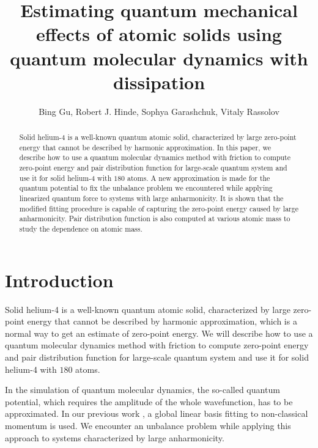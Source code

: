 \documentclass[11pt,letter,nocenter]{revtex4-1}
\begin{document}
\title{Estimating quantum mechanical effects of atomic solids using quantum molecular dynamics with dissipation}
\author{Bing Gu, Robert J. Hinde, Sophya Garashchuk, Vitaly Rassolov}

\begin{abstract}
 Solid helium-4 is a well-known quantum atomic solid, characterized by large zero-point energy that cannot be described by harmonic approximation. In this paper, we describe  how to use a quantum molecular dynamics method with friction to compute zero-point energy and pair distribution function for large-scale quantum system and use it for solid helium-4 with $180$ atoms.  A new approximation is made for the quantum potential to fix the unbalance problem we encountered while applying linearized quantum force \cite{Garashchuk2004} to systems with large anharmonicity.  It  is shown that the modified fitting procedure is capable of capturing the zero-point energy caused by large anharmonicity. Pair distribution function is also computed at various atomic mass to study the dependence on atomic mass. 

\end{abstract}

\maketitle

\section{Introduction}

 Solid helium-4 is a well-known quantum atomic solid, characterized by large zero-point energy that cannot be described by harmonic approximation, which is a normal way to get an estimate of zero-point energy.  
We will describe how to use a quantum molecular dynamics method with friction to compute zero-point energy and pair distribution function for large-scale quantum system and use it for solid helium-4 with $180$ atoms. 

In the simulation of quantum molecular dynamics, the so-called quantum potential, which requires the amplitude of the whole wavefunction, has to be approximated. In our previous work \cite{Garashchuk2011}, a global linear basis fitting to non-classical momentum  \cite{Garashchuk2004} is used. We encounter an unbalance problem while applying this approach to systems characterized by large anharmonicity.  
 
\end{document}
